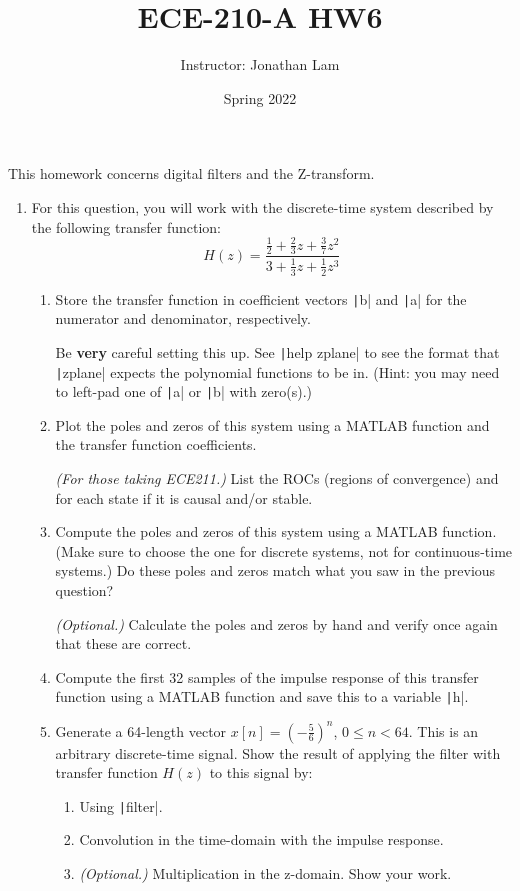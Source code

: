 \documentclass{article}
\title{ECE-210-A HW6}
\author{Instructor: Jonathan Lam}
\date{Spring 2022}
\begin{document}
\maketitle

\noindent This homework concerns digital filters and the Z-transform.
\begin{enumerate}
\item For this question, you will work with the discrete-time system described by the following transfer function:
  \begin{equation*}
    H(z)=\frac{\frac{1}{2}+\frac{2}{3}z+\frac{3}{7}z^2}{3+\frac{1}{3}z+\frac{1}{2}z^3}
  \end{equation*}
  \begin{enumerate}
  \item Store the transfer function in coefficient vectors \texttt|b| and \texttt|a| for the numerator and denominator, respectively.

    Be \textbf{very} careful setting this up. See \texttt|help zplane| to see the format that \texttt|zplane| expects the polynomial functions to be in. (Hint: you may need to left-pad one of \texttt|a| or \texttt|b| with zero(s).)

  \item Plot the poles and zeros of this system using a MATLAB function and the transfer function coefficients.

    \textit{(For those taking ECE211.)} List the ROCs (regions of convergence) and for each state if it is causal and/or stable.

  \item Compute the poles and zeros of this system using a MATLAB function. (Make sure to choose the one for discrete systems, not for continuous-time systems.) Do these poles and zeros match what you saw in the previous question?

    \textit{(Optional.)} Calculate the poles and zeros by hand and verify once again that these are correct.

  \item Compute the first 32 samples of the impulse response of this transfer function using a MATLAB function and save this to a variable \texttt|h|.

  \item Generate a 64-length vector $x[n]=\left(-\frac{5}{6}\right)^n$, $0\le n<64$. This is an arbitrary discrete-time signal. Show the result of applying the filter with transfer function $H(z)$ to this signal by:
    \begin{enumerate}
    \item Using \texttt|filter|.
    \item Convolution in the time-domain with the impulse response.
    \item \textit{(Optional.)} Multiplication in the z-domain. Show your work.


\end{enumerate}
\end{enumerate}
\end{enumerate}
\end{document}
